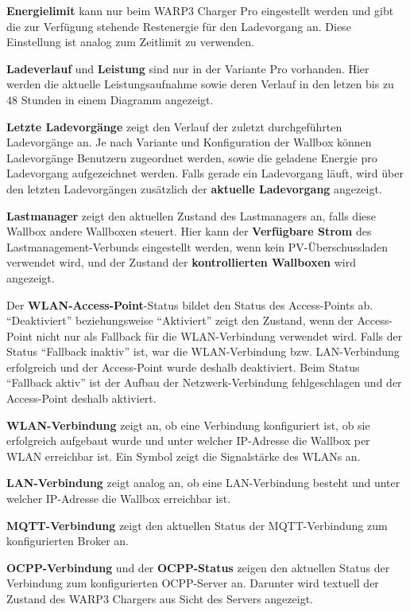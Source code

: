 \documentclass[a4paper,10pt]{article}
\begin{document}
\begin{multicols*}{2}
    \textbf{Energielimit} kann nur beim WARP3 Charger Pro eingestellt werden und gibt die zur Verfügung stehende Restenergie für den
    Ladevorgang an. Diese Einstellung ist analog zum Zeitlimit zu verwenden.

    \textbf{Ladeverlauf} und \textbf{Leistung} sind nur in der Variante Pro
    vorhanden. Hier werden die aktuelle Leistungsaufnahme sowie deren Verlauf in den letzen bis zu 48 Stunden in einem Diagramm angezeigt.

    \textbf{Letzte Ladevorgänge} zeigt den Verlauf der zuletzt durchgeführten
	Ladevorgänge an. Je nach Variante und Konfiguration der Wallbox können Ladevorgänge Benutzern
	zugeordnet werden, sowie die geladene Energie pro Ladevorgang aufgezeichnet werden. Falls gerade ein Ladevorgang läuft,
	wird über den letzten Ladevorgängen zusätzlich der \textbf{aktuelle Ladevorgang} angezeigt.

    \textbf{Lastmanager} zeigt den aktuellen Zustand des Lastmanagers an, falls diese Wallbox
    andere Wallboxen steuert. Hier kann der \textbf{Verfügbare Strom} des Lastmanagement-Verbunds
    eingestellt werden, wenn kein PV-Überschussladen verwendet wird, und der Zustand der \textbf{kontrollierten Wallboxen} wird angezeigt.


    Der \textbf{WLAN-Access-Point}-Status bildet den Status des Access-Points ab.
    \enquote{Deaktiviert} beziehungsweise \enquote{Aktiviert} zeigt den Zustand, wenn der Access-Point nicht
    nur als Fallback für die WLAN-Verbindung verwendet wird. Falls der Status \enquote{Fallback inaktiv} ist,
    war die WLAN-Verbindung bzw. LAN-Verbindung erfolgreich und der Access-Point wurde deshalb deaktiviert.
    Beim Status \enquote{Fallback aktiv} ist der Aufbau der Netzwerk-Verbindung fehlgeschlagen und der
    Access-Point deshalb aktiviert.

    \textbf{WLAN-Verbindung} zeigt an, ob eine Verbindung konfiguriert ist, ob sie erfolgreich aufgebaut wurde und
    unter welcher IP-Adresse die Wallbox per WLAN erreichbar ist. Ein Symbol
    zeigt die Signalstärke des WLANs an.

    \textbf{LAN-Verbindung} zeigt analog an, ob eine LAN-Verbindung besteht und unter welcher IP-Adresse die Wallbox erreichbar ist.

    \textbf{MQTT-Verbindung} zeigt den aktuellen Status der MQTT-Verbindung
    zum konfigurierten Broker an.

    \textbf{OCPP-Verbindung} und der \textbf{OCPP-Status} zeigen den aktuellen Status der Verbindung zum konfigurierten OCPP-Server an.
    Darunter wird textuell der Zustand des WARP3 Chargers aus Sicht des Servers angezeigt.


\end{multicols*}
\end{document}
